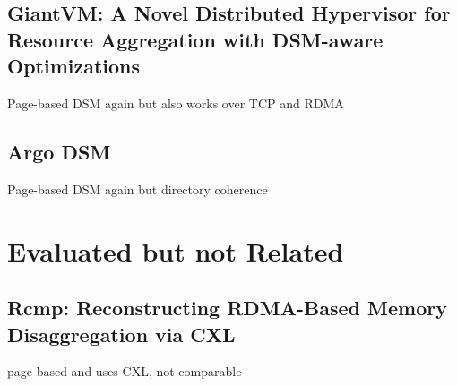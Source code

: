 \documentclass[sigplan,nonacm]{acmart}
\begin{document}
\subsection {GiantVM: A Novel Distributed Hypervisor for Resource Aggregation with DSM-aware Optimizations}
Page-based DSM again but also works over TCP and RDMA\cite{Jia-ACO-2022}


\subsection{Argo DSM}
Page-based DSM again but directory coherence




\section{Evaluated but not Related}
\subsection{Rcmp: Reconstructing RDMA-Based Memory Disaggregation via CXL}
page based and uses CXL, not comparable\cite{Wang-ACO-2024}




\end{document}
